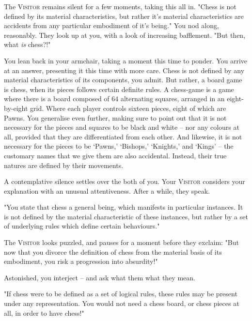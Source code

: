 The \textsc{Visitor} remains silent for a few moments, taking this all in. "Chess is not defined by its material characteristics, but rather it's material characteristics are accidents from any particular embodiment of it's being." You nod along, reasonably. They look up at you, with a look of increasing bafflement. "But then, what \emph{is} chess?!"


You lean back in your armchair, taking a moment this time to ponder. You arrive at an answer, presenting it this time with more care. Chess is not defined by any material characteristics of its components, you admit. But rather, a board game is chess, when its pieces follows certain definite rules. A chess-game is a game where there is a board composed of 64 alternating squares, arranged in an eight-by-eight grid. Where each player controls sixteen pieces, eight of which are Pawns. You generalise even further, making sure to point out that it is not necessary for the pieces and squares to be black and white -- nor any colours at all, provided that they are differentiated from each other. And likewise, it is not necessary for the pieces to be `Pawns,' `Bishops,' `Knights,' and `Kings' -- the customary names that we give them are also accidental. Instead, their true natures are defined by their movements.

A contemplative silence settles over the both of you. Your \textsc{Visitor} considers your explanation with an unusual attentiveness. After a while, they speak.

"You state that chess a general being, which manifests in particular instances. It is not defined by the material characteristic of these instances, but rather by a set of underlying rules which define certain behaviours."

The \textsc{Visitor} looks puzzled, and pauses for a moment before they exclaim: "But now that you divorce the definition of chess from the material basis of its embodiment, you risk a progression into absurdity!"

Astonished, you interject -- and ask what them what they mean.

"If chess were to be defined as a set of logical rules, these rules may be present under any representation. You would not need a chess board, or chess pieces at all, in order to have chess!"

